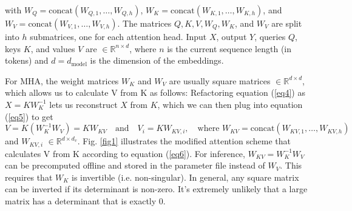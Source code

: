 \documentclass{article}
\newcommand{\eR}[2]{$\in \mathbb{R}^{#1 \times #2}$} %
\begin{document}
with $W_Q = \text{concat}(W_{Q,1}, \ldots, W_{Q,h})$, $W_K = \text{concat}(W_{K,1}, \ldots, W_{K,h})$, and $W_V = \text{concat}(W_{V,1}, \ldots, W_{V,h})$. The matrices $Q, K, V, W_Q, W_K$, and $W_V$ are split into $h$ submatrices, one for each attention head. Input $X$, output $Y$, queries $Q$, keys $K$, and values $V$ are \eR{n}{d}, where $n$ is the current sequence length (in tokens) and $d = d_{\text{model}}$ is the dimension of the embeddings.

For MHA, the weight matrices $W_K$ and $W_V$ are usually square matrices \eR{d}{d}, which allows us to calculate V from K as follows: Refactoring equation (\ref{eq4}) as $X = K W_K^{-1}$ lets us reconstruct $X$ from $K$, which we can then plug into equation (\ref{eq5}) to get
\begin{equation}
  V = K (W_K^{-1} W_V) = K W_{KV} \quad \text{and} \quad V_i = K W_{KV,i}, \quad \text{where } W_{KV} = \text{concat}(W_{KV,1}, \ldots, W_{KV,h})
\label{eq6} \end{equation}
and $W_{KV,i}$ \eR{d}{d_v}. Fig. \ref{fig1} illustrates the modified attention scheme that calculates V from K according to equation (\ref{eq6}). For inference, $W_{KV} = W_K^{-1} W_V$ can be precomputed offline and stored in the parameter file instead of $W_V$. This requires that $W_K$ is invertible (i.e. non-singular). In general, any square matrix can be inverted if its determinant is non-zero. It’s extremely unlikely that a large matrix has a determinant that is exactly 0.
\end{document}
